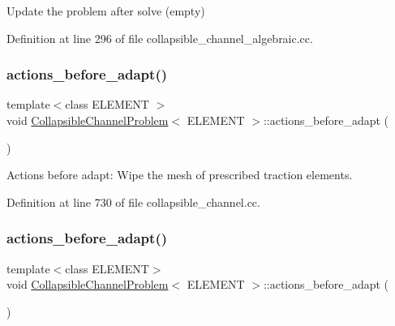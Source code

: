 Update the problem after solve (empty) 



Definition at line 296 of file collapsible\+\_\+channel\+\_\+algebraic.\+cc.

\mbox{\label{classCollapsibleChannelProblem_a54abc5259d590154e5dfa458d885c16c}} 
\subsubsection{\texorpdfstring{actions\+\_\+before\+\_\+adapt()}{actions\_before\_adapt()}\hspace{0.1cm}{\footnotesize\ttfamily [1/2]}}
{\footnotesize\ttfamily template$<$class E\+L\+E\+M\+E\+NT $>$ \\
void \hyperlink{classCollapsibleChannelProblem}{Collapsible\+Channel\+Problem}$<$ E\+L\+E\+M\+E\+NT $>$\+::actions\+\_\+before\+\_\+adapt (\begin{DoxyParamCaption}{ }\end{DoxyParamCaption})}



Actions before adapt\+: Wipe the mesh of prescribed traction elements. 



Definition at line 730 of file collapsible\+\_\+channel.\+cc.

\mbox{\label{classCollapsibleChannelProblem_a54abc5259d590154e5dfa458d885c16c}} 
\subsubsection{\texorpdfstring{actions\+\_\+before\+\_\+adapt()}{actions\_before\_adapt()}\hspace{0.1cm}{\footnotesize\ttfamily [2/2]}}
{\footnotesize\ttfamily template$<$class E\+L\+E\+M\+E\+NT$>$ \\
void \hyperlink{classCollapsibleChannelProblem}{Collapsible\+Channel\+Problem}$<$ E\+L\+E\+M\+E\+NT $>$\+::actions\+\_\+before\+\_\+adapt (\begin{DoxyParamCaption}{ }\end{DoxyParamCaption})}



